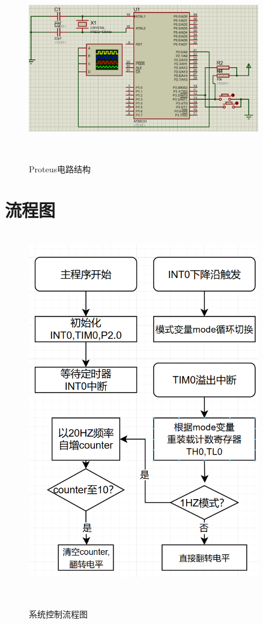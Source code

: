 \documentclass[12pt,hyperref,a4paper,UTF8]{ctexart}
\begin{document}
\begin{figure}[H] %
        \centering
        \includegraphics[width=0.9\textwidth]{figures/205.png} %
        \caption{Proteus电路结构 } %
        \label{fig:example} %
\end{figure}

\section{流程图}


\begin{figure}[H] %
        \centering
        \includegraphics[width=0.9\textwidth]{figures/301.png} %
        \caption{系统控制流程图} %
        \label{fig:example} %
\end{figure}
\end{document}
